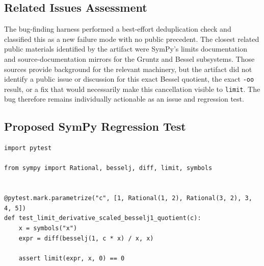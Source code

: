\documentclass[11pt]{article}
\begin{document}
\subsection{Related Issues Assessment}

The bug-finding harness performed a best-effort deduplication check and
classified this as a new failure mode with no public precedent. The closest
related public materials identified by the artifact were SymPy's limits
documentation and source-documentation mirrors for the Gruntz and Bessel
subsystems. Those sources provide background for the relevant machinery, but
the artifact did not identify a public issue or discussion for this exact
Bessel quotient, the exact \texttt{-oo} result, or a fix that would necessarily
make this cancellation visible to \texttt{limit}. The bug therefore remains
individually actionable as an issue and regression test.

\subsection{Proposed SymPy Regression Test}

\medskip

\begin{lstlisting}[style=bugpython]
import pytest

from sympy import Rational, besselj, diff, limit, symbols


@pytest.mark.parametrize("c", [1, Rational(1, 2), Rational(3, 2), 3, 4, 5])
def test_limit_derivative_scaled_besselj1_quotient(c):
    x = symbols("x")
    expr = diff(besselj(1, c * x) / x, x)

    assert limit(expr, x, 0) == 0
\end{lstlisting}
\end{document}
